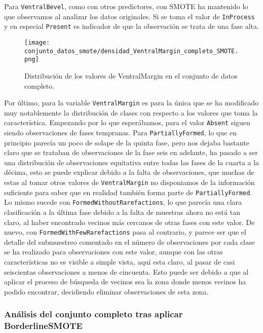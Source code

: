 Para \texttt{VentralBevel}, como con otros predictores, con SMOTE ha mantenido lo que observamos al analizar los datos originales. Si se toma el valor de \texttt{InProcess} y en especial \texttt{Present} es indicador de que la observación se trata de una fase alta.


\begin{figure}[H]
	\centering
	\texttt{[image: conjunto\_datos\_smote/densidad\_VentralMargin\_completo\_SMOTE.png]}
	\caption{Distribución de los valores de VentralMargin en el conjunto de datos completo.}
	\label{fig:densidad_VentralMargin_completo_smote}
\end{figure}

Por último, para la variable \texttt{VentralMargin} es para la única que se ha modificado muy notablemente la distribución de clases con respecto a los valores que toma la característica. Empezando por lo que esperábamos, para el valor \texttt{Absent} siguen siendo observaciones de fases tempranas. Para \texttt{PartiallyFormed}, lo que en principio parecía un poco de solape de la quinta fase, pero nos dejaba bastante claro que se trataban de observaciones de la fase seis en adelante, ha pasado a ser una distribución de observaciones equitativa entre todas las fases de la cuarta a la décima, esto se puede explicar debido a la falta de observaciones, que muchas de estas al tomar otros valores de \texttt{VentralMargin} no disponiamos de la información suficiente para saber que en realidad también forma parte de \texttt{PartiallyFormed}. Lo mismo sucede con \texttt{FormedWithoutRarefactions}, lo que parecía una clara clasificación a la última fase debido a la falta de muestras ahora no está tan claro, al haber encontrado vecinos más cercanos de otras fases con este valor. De nuevo, con \texttt{FormedWithFewRarefactions} pasa al contrario, y parece ser que el detalle del submuestreo comentado en el número de observaciones por cada clase se ha realizado para observaciones con este valor, aunque con las otras características no es visible a simple vista, aquí esta claro, al pasar de casi seiscientas observaciones a menos de cincuenta. Esto puede ser debido a que al aplicar el proceso de búsqueda de vecinos sea la zona donde menos vecinos ha podido encontrar, decidiendo eliminar observaciones de esta zona.

\newpage


\subsubsection{Análisis del conjunto completo tras aplicar BorderlineSMOTE}

